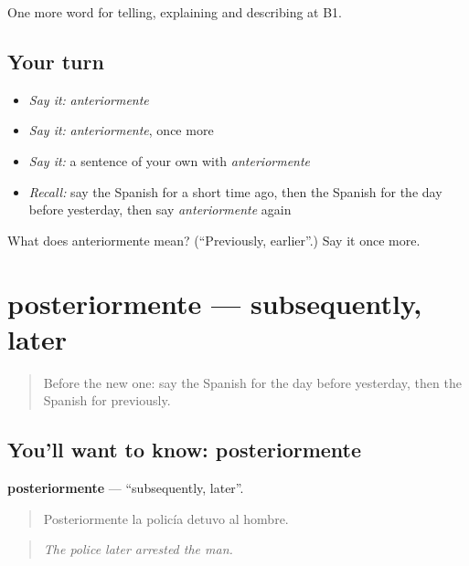 \begin{grammarlens}[title={What you've built}]
One more word for telling, explaining and describing at B1.
\end{grammarlens}

\subsection*{Your turn}
\begin{itemize}
\raggedright
  \item \emph{Say it:} \emph{anteriormente}
  \item \emph{Say it:} \emph{anteriormente}, once more
  \item \emph{Say it:} a sentence of your own with \emph{anteriormente}
  \item \emph{Recall:} say the Spanish for a short time ago, then the Spanish for the day before yesterday, then say \emph{anteriormente} again
\end{itemize}

\begin{tcolorbox}[breakable,colback=teal!4,colframe=teal!35!black,title={Before you move on}]
What does anteriormente mean? (\textquotedblleft{}Previously, earlier\textquotedblright{}.) Say it once more.
\end{tcolorbox}
\section[posteriormente]{posteriormente — subsequently, later}

\label{lesson:ES-C538-posteriormente}



\begin{quote}
Before the new one: say the Spanish for the day before yesterday, then the Spanish for previously.
\end{quote}

\subsection*{You'll want to know: posteriormente}
\textbf{posteriormente} — \textquotedblleft{}subsequently, later\textquotedblright{}.

\begin{quote}
Posteriormente la policía detuvo al hombre.
\end{quote}

\begin{quote}
\emph{The police later arrested the man.}
\end{quote}

